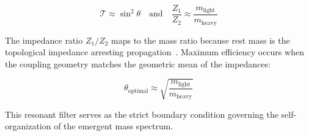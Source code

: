 \begin{equation}
    \mathcal{T} \approx \sin^2\theta \quad \text{and} \quad \frac{Z_1}{Z_2} \approx \frac{m_{\text{light}}}{m_{\text{heavy}}}
\end{equation}

The impedance ratio $Z_1/Z_2$ maps to the mass ratio because rest mass is the topological impedance arresting propagation~\cite{meyer_ieaction_2026}. Maximum efficiency occurs when the coupling geometry matches the geometric mean of the impedances:

\begin{equation}
    \theta_{\text{optimal}} \approx \sqrt{\frac{m_{\text{light}}}{m_{\text{heavy}}}}
\end{equation}

This resonant filter serves as the strict boundary condition governing the self-organization of the emergent mass spectrum.
